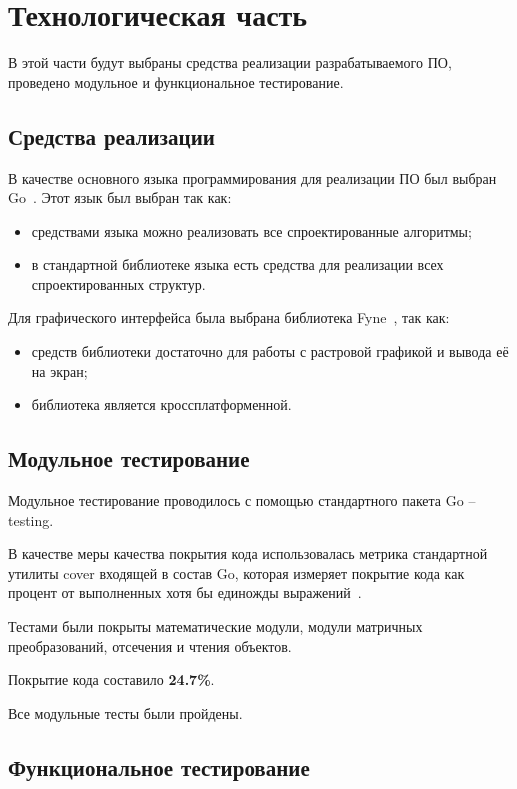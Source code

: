 \chapter{Технологическая часть}

В этой части будут выбраны средства реализации разрабатываемого ПО, проведено модульное и функциональное тестирование.

\section{Средства реализации}

В качестве основного языка программирования для реализации ПО был выбран Go~\cite{go}. Этот язык был выбран так как:

\begin{itemize}
	\item средствами языка можно реализовать все спроектированные алгоритмы;
	\item в стандартной библиотеке языка есть средства для реализации всех спроектированных структур.
\end{itemize}

Для графического интерфейса была выбрана библиотека Fyne~\cite{fyne}, так как:

\begin{itemize}
	\item средств библиотеки достаточно для работы с растровой графикой и вывода её на экран;
	\item библиотека является кроссплатформенной.
\end{itemize}

\section{Модульное тестирование}

Модульное тестирование проводилось с помощью стандартного пакета Go -- testing. 

В качестве меры качества покрытия кода использовалась метрика стандартной утилиты cover входящей в состав Go, которая измеряет покрытие кода как процент от выполненных хотя бы единожды выражений~\cite{cover}.

Тестами были покрыты математические модули, модули матричных преобразований, отсечения и чтения объектов.

Покрытие кода составило \textbf{24.7\%}.

Все модульные тесты были пройдены.

\section{Функциональное тестирование}

